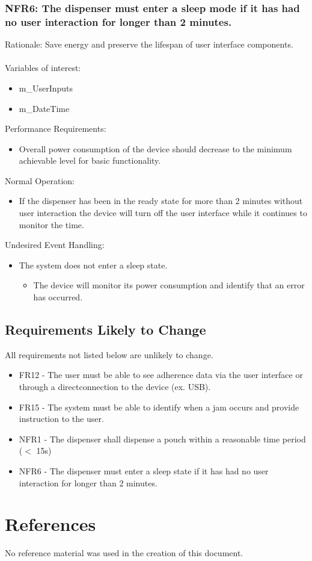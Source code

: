 \documentclass[12pt]{article}
\begin{document}
\subsubsection*{NFR6: The dispenser must enter a sleep mode if it has had no user interaction for longer than 2 minutes.} 
Rationale: Save energy and preserve the lifespan of user interface components.
\\\\
Variables of interest:
\begin{itemize}[noitemsep,topsep=0pt]
    \item m\_UserInputs
    \item m\_DateTime
\end{itemize} 
\bigskip
Performance Requirements:
\begin{itemize}[noitemsep,topsep=0pt]
    \item Overall power consumption of the device should decrease to the minimum achievable level for basic functionality.
\end{itemize}
\bigskip
Normal Operation:
\begin{itemize}[noitemsep,topsep=0pt]
    \item If the dispenser has been in the ready state for more than 2 minutes without user interaction the device will turn off the user interface while it continues to monitor the time.
\end{itemize}
\bigskip
Undesired Event Handling:
\begin{itemize}[noitemsep,topsep=0pt]
    \item The system does not enter a sleep state.
    \begin{itemize}
        \item The device will monitor its power consumption and identify that an error has occurred.
    \end{itemize}
\end{itemize}
\bigskip

\subsection{Requirements Likely to Change}
\noindent All requirements not listed below are unlikely to change.

\begin{itemize}
    \item FR12 - The user must be able to see adherence data via the user interface or through a directconnection to the device (ex.  USB).
    \item FR15 - The system must be able to identify when a jam occurs and provide instruction to the user.
    \item NFR1 - The dispenser shall dispense a pouch within a reasonable time period ($<$ 15s) 
    \item NFR6 - The dispenser must enter a sleep state if it has had no user interaction for longer than 2 minutes.
\end{itemize}

\pagebreak
\section{References}

No reference material was used in the creation of this document.
\end{document}
